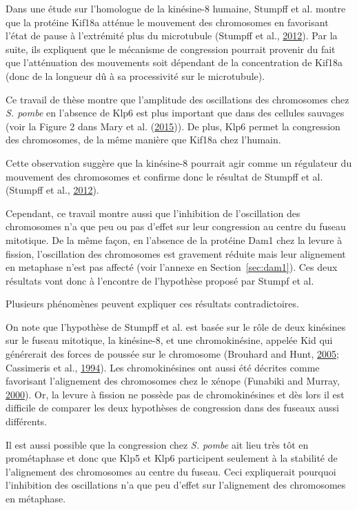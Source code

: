 \documentclass[12pt,a4paper,twoside,openright]{book}
\begin{document}
Dans une étude sur l'homologue de la kinésine-8 humaine, Stumpff et al.
montre que la protéine Kif18a atténue le mouvement des chromosomes en
favorisant l'état de pause à l'extrémité plus du microtubule (Stumpff et
al., \protect\hyperlink{ref-Stumpff2012}{2012}). Par la suite, ils
expliquent que le mécanisme de congression pourrait provenir du fait que
l'atténuation des mouvements soit dépendant de la concentration de
Kif18a (donc de la longueur dû à sa processivité sur le microtubule).

Ce travail de thèse montre que l'amplitude des oscillations des
chromosomes chez \emph{S. pombe} en l'absence de Klp6 est plus important
que dans des cellules sauvages (voir la Figure 2 dans Mary et al.
(\protect\hyperlink{ref-Mary2015}{2015})). De plus, Klp6 permet la
congression des chromosomes, de la même manière que Kif18a chez
l'humain.

Cette observation suggère que la kinésine-8 pourrait agir comme un
régulateur du mouvement des chromosomes et confirme donc le résultat de
Stumpff et al. (Stumpff et al.,
\protect\hyperlink{ref-Stumpff2012}{2012}).

Cependant, ce travail montre aussi que l'inhibition de l'oscillation des
chromosomes n'a que peu ou pas d'effet sur leur congression au centre du
fuseau mitotique. De la même façon, en l'absence de la protéine Dam1
chez la levure à fission, l'oscillation des chromosomes est gravement
réduite mais leur alignement en metaphase n'est pas affecté (voir
l'annexe en Section~\ref{sec:dam1}). Ces deux résultats vont donc à
l'encontre de l'hypothèse proposé par Stumpf et al.

Plusieurs phénomènes peuvent expliquer ces résultats contradictoires.

On note que l'hypothèse de Stumpff et al. est basée sur le rôle de deux
kinésines sur le fuseau mitotique, la kinésine-8, et une chromokinésine,
appelée Kid qui générerait des forces de poussée sur le chromosome
(Brouhard and Hunt, \protect\hyperlink{ref-Brouhard2005}{2005};
Cassimeris et al., \protect\hyperlink{ref-Cassimeris1994}{1994}). Les
chromokinésines ont aussi été décrites comme favorisant l'alignement des
chromosomes chez le xénope (Funabiki and Murray,
\protect\hyperlink{ref-Funabiki2000}{2000}). Or, la levure à fission ne
possède pas de chromokinésines et dès lors il est difficile de comparer
les deux hypothèses de congression dans des fuseaux aussi différents.

Il est aussi possible que la congression chez \emph{S. pombe} ait lieu
très tôt en prométaphase et donc que Klp5 et Klp6 participent seulement
à la stabilité de l'alignement des chromosomes au centre du fuseau. Ceci
expliquerait pourquoi l'inhibition des oscillations n'a que peu d'effet
sur l'alignement des chromosomes en métaphase.
\end{document}
